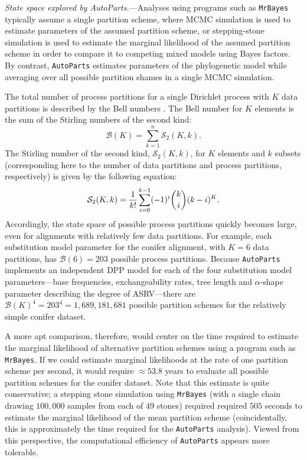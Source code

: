 \documentclass[11pt]{article}
\begin{document}
\bigskip
\emph{State space explored by AutoParts.}---Analyses using programs such as \verb!MrBayes! typically assume a single partition scheme, where MCMC simulation is used to estimate parameters of the assumed partition scheme, or stepping-stone simulation is used to estimate the marginal likelihood of the assumed partition scheme in order to compare it to competing mixed models using Bayes factors.
By contrast, \verb!AutoParts! estimates parameters of the phylogenetic model while averaging over all possible partition shames in a single MCMC simulation.
 
The total number of process partitions for a single Dirichlet process with $K$ data partitions is described by the Bell numbers \citep[][]{bell34}.
The Bell number for $K$ elements is the sum of the Stirling numbers of the second kind:
$$
\mathcal{B}(K) = \sum_{k=1}^n \mathcal{S}_2(K,k).
$$
The Stirling number of the second kind, $\mathcal{S}_2(K,k)$, for $K$ elements and $k$ subsets (corresponding here to the number of data partitions and process partitions, respectively) is given by the following equation:
$$
\mathcal{S}_2(K, k) = {1 \over k!} \sum_{i=0}^{k-1} (-1)^i {k \choose i} (k-i)^{K}.
$$
Accordingly, the state space of possible process partitions quickly becomes large, even for alignments with relatively few data partitions.
For example, each substitution model parameter for the conifer alignment, with $K = 6$ data partitions, has $\mathcal{B}(6) = 203$ possible process partitions.
Because \verb!AutoParts! implements an independent DPP  model for each of the four substitution model parameters---base frequencies, exchangeability rates, tree length and $\alpha$-shape parameter describing the degree of ASRV---there are $\mathcal{B}(K)^4 = 203^4 = 1,689,181,681$ possible partition schemes for the relatively simple conifer dataset.

A more apt comparison, therefore, would center on the time required to estimate the marginal likelihood of alternative partition schemes using a program such as \verb!MrBayes!.
If we could estimate marginal likelihoods at the rate of one partition scheme per second, it would require $\approx 53.8$ years to evaluate all possible partition schemes for the conifer dataset.
Note that this estimate is quite conservative; a stepping stone simulation using \verb!MrBayes! (with a single chain drawing $100,000$ samples from each of 49 stones) required required $505$ seconds to estimate the marginal likelihood of the mean partition scheme (coincidentally, this is approximately the time required for the \verb!AutoParts! analysis).
Viewed from this perspective, the computational efficiency of \verb!AutoParts! appears more tolerable.
\end{document}
